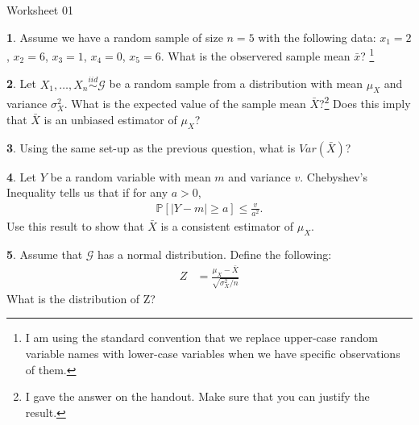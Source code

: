 \documentclass{tufte-handout}
\newcommand{\iid}{\stackrel{iid}{\sim}}
\begin{document}
\justify

{\LARGE Worksheet 01}

\vspace*{18pt}


\textbf{1}. Assume we have a random sample of size $n = 5$ with the following data:
$x_1 = 2$, $x_2 = 6$, $x_3 = 1$, $x_4 = 0$, $x_5 = 6$. What is the observered
sample mean $\bar{x}$? 
\footnote{
  I am using the standard convention that we replace upper-case random 
  variable names with lower-case variables when we have specific 
  observations of them. 
}

\textbf{2}. Let $X_1, \ldots, X_n \iid \mathcal{G}$ be a random sample from a distribution
with mean $\mu_X$ and variance $\sigma^2_X$. What is the expected value of the
sample mean $\bar{X}$?\footnote{
  I gave the answer on the handout. Make sure that you can justify
  the result.
} Does this imply that $\bar{X}$ is an unbiased estimator of $\mu_X$?

\textbf{3}. Using the same set-up as the previous question, what is $Var(\bar{X})$?

\textbf{4}. Let $Y$ be a random variable with mean $m$ and variance $v$. Chebyshev's
Inequality tells us that if for any $a > 0$,
\begin{align*}
\mathbb{P}[ |Y - m| \geq a] \leq \frac{v}{a^2}.
\end{align*}
Use this result to show that $\bar{X}$ is a consistent estimator of $\mu_X$.

\textbf{5}. Assume that $\mathcal{G}$ has a normal distribution. Define the following:
\begin{align*}
Z &= \frac{\mu_X - \bar{X}}{\sqrt{\sigma_X^2 / n}}
\end{align*}
What is the distribution of Z?
\end{document}
